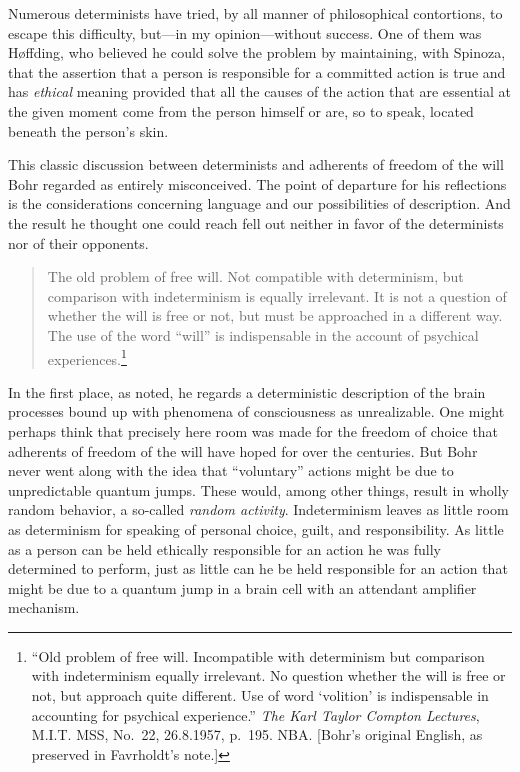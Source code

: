 \documentclass[12pt,a4paper]{book}
\begin{document}
Numerous determinists have tried, by all manner of philosophical contortions, to escape this difficulty, but---in my opinion---without success. One of them was Høffding, who believed he could solve the problem by maintaining, with Spinoza, that the assertion that a person is responsible for a committed action is true and has \emph{ethical} meaning provided that all the causes of the action that are essential at the given moment come from the person himself or are, so to speak, located beneath the person's skin.

This classic discussion between determinists and adherents of freedom of the will Bohr regarded as entirely misconceived. The point of departure for his reflections is the considerations concerning language and our possibilities of description. And the result he thought one could reach fell out neither in favor of the determinists nor of their opponents.

\begin{quote}
The old problem of free will. Not compatible with determinism, but comparison with indeterminism is equally irrelevant. It is not a question of whether the will is free or not, but must be approached in a different way. The use of the word ``will'' is indispensable in the account of psychical experiences.\footnote{``Old problem of free will. Incompatible with determinism but comparison with indeterminism equally irrelevant. No question whether the will is free or not, but approach quite different. Use of word `volition' is indispensable in accounting for psychical experience.'' \emph{The Karl Taylor Compton Lectures}, M.I.T. MSS, No.~22, 26.8.1957, p.~195. NBA. [Bohr's original English, as preserved in Favrholdt's note.]}
\end{quote}

In the first place, as noted, he regards a deterministic description of the brain processes bound up with phenomena of consciousness as unrealizable. One might perhaps think that precisely here room was made for the freedom of choice that adherents of freedom of the will have hoped for over the centuries. But Bohr never went along with the idea that ``voluntary'' actions might be due to unpredictable quantum jumps. These would, among other things, result in wholly random behavior, a so-called \emph{random activity}. Indeterminism leaves as little room as determinism for speaking of personal choice, guilt, and responsibility. As little as a person can be held ethically responsible for an action he was fully determined to perform, just as little can he be held responsible for an action that might be due to a quantum jump in a brain cell with an attendant amplifier mechanism.
\end{document}
